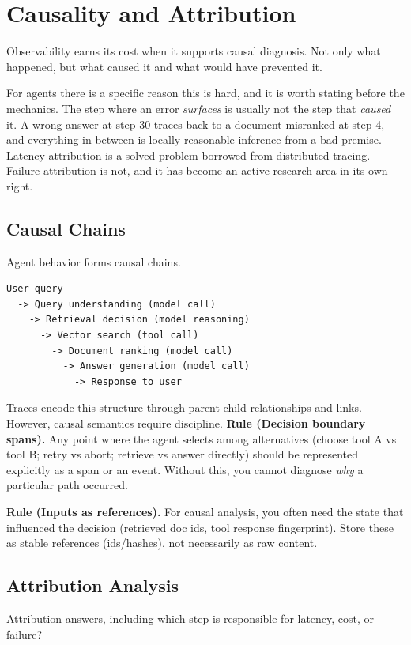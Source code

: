 \section{Causality and Attribution}

Observability earns its cost when it supports causal diagnosis. Not only what
happened, but what caused it and what would have prevented it.

For agents there is a specific reason this is hard, and it is worth stating before
the mechanics. The step where an error \emph{surfaces} is usually not the step
that \emph{caused} it. A wrong answer at step 30 traces back to a document
misranked at step 4, and everything in between is locally reasonable inference
from a bad premise. Latency attribution is a solved problem borrowed from
distributed tracing. Failure attribution is not, and it has become an active
research area in its own right.

\subsection{Causal Chains}

Agent behavior forms causal chains. \begin{verbatim}
User query
  -> Query understanding (model call)
    -> Retrieval decision (model reasoning)
      -> Vector search (tool call)
        -> Document ranking (model call)
          -> Answer generation (model call)
            -> Response to user
\end{verbatim}

Traces encode this structure through parent-child relationships and links. However, causal semantics require discipline. \textbf{Rule (Decision boundary spans).} Any point where the agent selects among alternatives (choose tool A vs tool B; retry vs abort; retrieve vs answer directly) should be represented explicitly as a span or an event. Without this, you cannot diagnose \emph{why} a particular path occurred.

\textbf{Rule (Inputs as references).} For causal analysis, you often need the state that influenced the decision (retrieved doc ids, tool response fingerprint). Store these as stable references (ids/hashes), not necessarily as raw content.

\subsection{Attribution Analysis}

Attribution answers, including which step is responsible for latency, cost, or failure?

